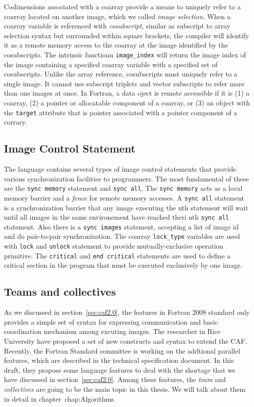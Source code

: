 Codimensions associated with a coarray provide a means to uniquely refer to a coarray located on another image, which we called \emph{image selection}. When a coarray variable is referenced with \emph{cosubscript}, similar as subscript to array selection syntax but surrounded within square brackets, the compiler will identify it as a remote memory access to the coarray at the image identified by the cosubscripts. The intrinsic functionn \texttt{image\_index} will return the image index of the image containing a specified coarray variable with a specified set of cosubscripts. Unlike the array reference, cosubscripts must uniquely refer to a single image. It cannot use subscript triplets and vector subscripts to refer more than one images at once. In Fortran, a data oject is remote accessible if it is (1) a coarray, (2) a pointer or allocatable component of a coarray, or (3) an object with the \texttt{target} attribute that is pointer associated with a pointer component of a corrary. 

\subsection{Image Control Statement}
The language contains several types of image control statements that provide various synchronization facilities to programmers. The most fundamental of these are the \texttt{sync memory} statement and \texttt{sync all}, The \texttt{sync memory} acts as a local memory barrier and a \textit{fence} for remote memory accesses. A \texttt{sync all} statement is a synchronization barrier that any image executing the nth statement will wait until all images in the same environement have reached theri nth \texttt{sync all} statement.  Also there is a \texttt{sync images} statement, accepting a list of image id and do pair-to-pair synchronization. 
The coarray \texttt{lock\_type} variables are used with \texttt{lock} and \texttt{unlock} statement to provide mutually-exclusive operation primitive. The \texttt{critical} and \texttt{end critical} statements are used to define a critical section in the program that must be executed exclusively by one image. 
\subsection{Teams and collectives}
As we discussed in section~\ref{sec:caf2.0}, the features in Fortran 2008 standard only provides a simple set of syntax for expressing communication and basic coordination mechanism among excuting images. The researcher in Rice University have proposed a set of new constructs and syntax to extend the CAF. Recently, the Fortran Standard committee is working on the addtional parallel features, which are described in the technical specification document\cite{caf-spec}. In this draft, they propose some language features to deal with the shortage that we have discussed in section~\ref{sec:caf2.0}. Among these features, the \emph{team} and \emph{collectives} are going to be the main topic in this thesis. We will talk about them in detail in chapter~{chap:Algorithms}.

